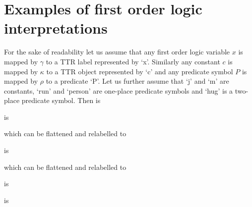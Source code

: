 \section{Examples of first order logic interpretations}

For the sake of readability let us assume that any first order
logic variable $x$ is mapped by $\gamma$ to a TTR label represented by
`x'. Similarly any constant $c$ is mapped by $\kappa$ to a TTR object
represented by `c' and any predicate symbol $P$ is mapped by $\rho$ to
a predicate `P'.  Let us further assume that `j' and `m' are constants,
`run' and `person' are one-place predicate symbols and `hug' is a
two-place predicate symbol.  Then
 is 
\begin{display}
\end{display}
 is
\begin{display}
\end{display}
which can be flattened and relabelled to
\begin{display}
\end{display}
 is
\begin{display}
\end{display}
which can be flattened and relabelled to 
\begin{display}
\end{display}
 is
\begin{display}
\end{display}
 is
\begin{display}
\end{display}
